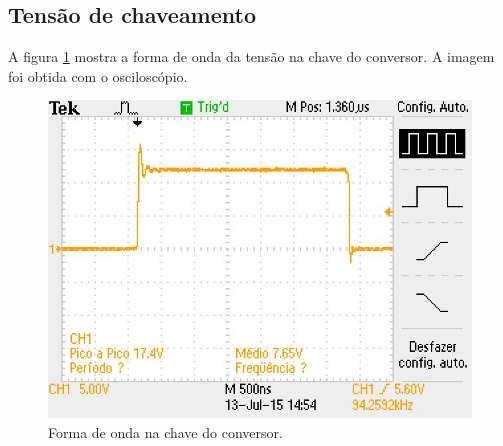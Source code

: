 \subsection{Tensão de chaveamento}
A figura \ref{f_vch} mostra a forma de onda da tensão na chave do conversor. A imagem foi obtida com o osciloscópio.

\begin{figure}[H]
	\centering
	\includegraphics[scale=0.5]{Imagens/Vch.jpg}
	\caption{Forma de onda na chave do conversor.}
	\label{f_vch}
\end{figure}